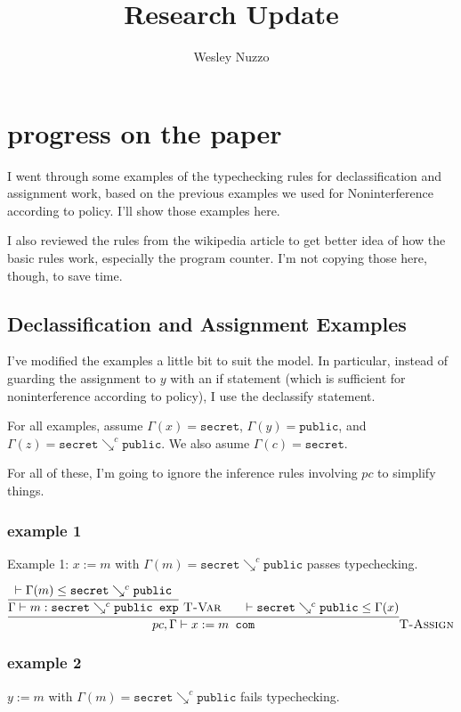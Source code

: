 \documentclass[11pt, oneside]{article}   	%
\title{Research Update}
\author{Wesley Nuzzo}
\begin{document}
\maketitle

\section{progress on the paper}

I went through some examples of the typechecking rules for declassification and assignment work, based on the previous examples we used for Noninterference according to policy.
I'll show those examples here.

I also reviewed the rules from the wikipedia article to get better idea of how the basic rules work, especially the program counter.
I'm not copying those here, though, to save time.

\subsection{Declassification and Assignment Examples}

I've modified the examples a little bit to suit the model. In particular, instead of guarding the assignment to $y$ with an if statement (which is sufficient for noninterference according to policy), I use the declassify statement. 

For all examples, assume $\Gamma(x)=\texttt{secret}$, $\Gamma(y)=\texttt{public}$, and $\Gamma(z)=\texttt{secret} \searrow ^{c}\texttt{public}$.
We also asume $\Gamma(c)=\texttt{secret}$.

For all of these, I'm going to ignore the inference rules involving $pc$ to simplify things.

\subsubsection{example 1}
Example 1: $x:=m$ with $\Gamma(m)=\texttt{secret} \searrow ^{c}\texttt{public}$ passes typechecking.

\[\infer{pc, \Gamma \vdash x:=m \texttt{ com}}
	  {\infer{\Gamma\vdash m:\texttt{secret} \searrow ^{c}\texttt{public} \texttt{ exp} }
	  	   {\vdash\Gamma(m)\le \texttt{secret} \searrow ^{c}\texttt{public} }
		   {\textsc{ T-Var}}
	   &&
	   \vdash \texttt{secret} \searrow ^{c}\texttt{public} \le \Gamma(x)}
	  {\textsc{T-Assign}}\]


\subsubsection{example 2}
$y:=m$ with $\Gamma(m)=\texttt{secret} \searrow ^{c}\texttt{public}$ fails typechecking.
\end{document}
